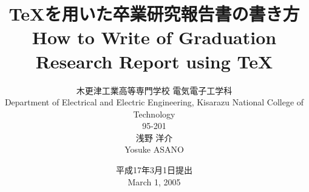 \documentclass[fleqn]{ujreport}%
\title{\bf
  \TeX を用いた卒業研究報告書の書き方 \\
  \normalsize How to Write of Graduation Research Report using \TeX 
  \smallskip
  \large\bf
  }
\date{
  平成17年3月1日提出 \\
  \normalsize March 1, 2005
  }
\author{
  木更津工業高等専門学校 電気電子工学科 \\     
  \normalsize Department of Electrical and Electric Engineering, 
   Kisarazu National College of Technology \\
   \vspace*{5mm}
  95-201 \\
  浅野 洋介\\
  \normalsize Yosuke ASANO
  }
\begin{document}
\maketitle
\maegaki         %

\maetsuke        %
\tableofcontents %
\listoffigures   %
\listoftables    %
\hombun          %




\shaji          %
 
\bunken         %
 
\appendix       %

\end{document}
